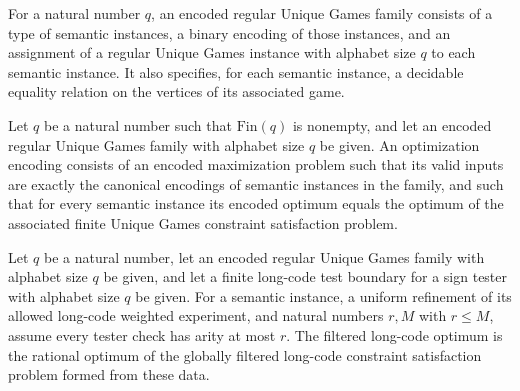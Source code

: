 \begin{definition}
\label{FABL.EncodedRegularUniqueGamesFamily}
\leanok
{}
For a natural number $q$, an encoded regular Unique Games family consists of a type of
semantic instances, a binary encoding of those instances, and an assignment of a regular
Unique Games instance with alphabet size $q$ to each semantic instance. It also
specifies, for each semantic instance, a decidable equality relation on the vertices of
its associated game.
\end{definition}

\begin{definition}
\label{FABL.EncodedRegularUniqueGamesFamily.OptimizationEncoding}
\leanok
{}
Let $q$ be a natural number such that $\mathrm{Fin}(q)$ is nonempty, and let an encoded
regular Unique Games family with alphabet size $q$ be given. An optimization encoding
consists of an encoded maximization problem such that its valid inputs are exactly the
canonical encodings of semantic instances in the family, and such that for every
semantic instance its encoded optimum equals the optimum of the associated finite Unique
Games constraint satisfaction problem.
\end{definition}

\begin{definition}
\label{FABL.EncodedRegularUniqueGamesFamily.filteredLongCodeOptimum}
\leanok
{}
Let $q$ be a natural number, let an encoded regular Unique Games family with alphabet
size $q$ be given, and let a finite long-code test boundary for a sign tester with
alphabet size $q$ be given. For a semantic instance, a uniform refinement of its allowed
long-code weighted experiment, and natural numbers $r,M$ with $r\le M$, assume every
tester check has arity at most $r$. The filtered long-code optimum is the rational
optimum of the globally filtered long-code constraint satisfaction problem formed from
these data.
\end{definition}

